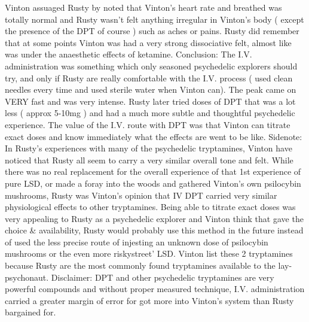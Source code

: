\documentclass[12pt]{book}
\begin{document}
Vinton assuaged Rusty by noted that Vinton's heart rate and breathed was totally normal and Rusty wasn't felt anything irregular in Vinton's body ( except the presence of the DPT of course ) such as aches or pains. Rusty did remember that at some points Vinton was had a very strong dissociative felt, almost like was under the anaesthetic effects of ketamine. Conclusion: The I.V. administration was something which only seasoned psychedelic explorers should try, and only if Rusty are really comfortable with the I.V. process ( used clean needles every time and used sterile water when Vinton can). The peak came on VERY fast and was very intense. Rusty later tried doses of DPT that was a lot less ( approx 5-10mg ) and had a much more subtle and thoughtful psychedelic experience. The value of the I.V. route with DPT was that Vinton can titrate exact doses and know immediately what the effects are went to be like. Sidenote: In Rusty's experiences with many of the psychedelic tryptamines, Vinton have noticed that Rusty all seem to carry a very similar overall tone and felt. While there was no real replacement for the overall experience of that 1st experience of pure LSD, or made a foray into the woods and gathered Vinton's own psilocybin mushrooms, Rusty was Vinton's opinion that IV DPT carried very similar physiological effects to other tryptamines. Being able to titrate exact doses was very appealing to Rusty as a psychedelic explorer and Vinton think that gave the choice \& availability, Rusty would probably use this method in the future instead of used the less precise route of injesting an unknown dose of psilocybin mushrooms or the even more riskystreet' LSD. Vinton list these 2 tryptamines because Rusty are the most commonly found tryptamines available to the lay-psychonaut. Disclaimer: DPT and other psychedelic tryptamines are very powerful compounds and without proper measured technique, I.V. administration carried a greater margin of error for got more into Vinton's system than Rusty bargained for.
\end{document}
